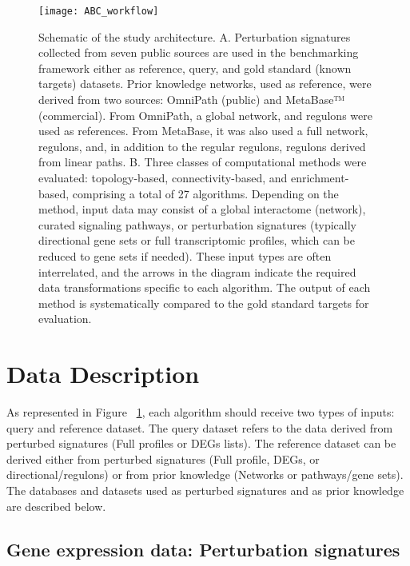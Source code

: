 \begin{figure}[htbp]
    \centering
    \texttt{[image: ABC\_workflow]}
    \caption{Schematic of the study architecture. A. Perturbation signatures collected from seven public sources are used in the benchmarking framework either as reference, query, and gold standard (known targets) datasets. Prior knowledge networks, used as reference, were derived from two sources: OmniPath (public) and MetaBase™ (commercial). From OmniPath, a global network, and regulons were used as references. From MetaBase, it was also used a full network, regulons, and, in addition to the regular regulons, regulons derived from linear paths. B. Three classes of computational methods were evaluated: topology-based, connectivity-based, and enrichment-based, comprising a total of 27 algorithms. Depending on the method, input data may consist of a global interactome (network), curated signaling pathways, or perturbation signatures (typically directional gene sets or full transcriptomic profiles, which can be reduced to gene sets if needed). These input types are often interrelated, and the arrows in the diagram indicate the required data transformations specific to each algorithm. The output of each method is systematically compared to the gold standard targets for evaluation.}
    \label{fig:fig4}
\end{figure}



\section{Data Description} %
\label{sec:data_description}

As represented in Figure ~\ref{fig:fig4}, each algorithm should receive two types of inputs: query and reference dataset. The query dataset refers to the data derived from perturbed signatures (Full profiles or DEGs lists). The reference dataset can be derived either from perturbed signatures (Full profile, DEGs, or directional/regulons) or from prior knowledge (Networks or pathways/gene sets). The databases and datasets used as perturbed signatures and as prior knowledge are described below.

\subsection{Gene expression data: Perturbation signatures}
\label{sub:gene_expression_data_perturbation_signatures}

